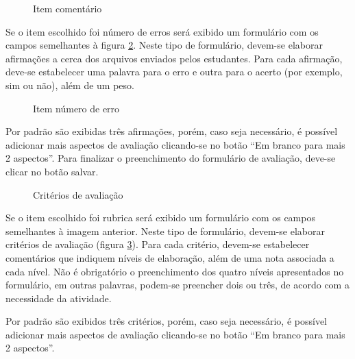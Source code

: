 \begin{figure}
 \begin{center}
  \caption{Item comentário}
  \label{fig:item_comentario}
 \end{center}
\end{figure}


Se o item escolhido foi número de erros será exibido um formulário com os campos semelhantes à figura \ref{fig:item_numero_erro}. Neste tipo de formulário, devem-se elaborar afirmações a cerca dos arquivos enviados pelos estudantes. Para cada afirmação, deve-se estabelecer uma palavra para o erro e outra para o acerto (por exemplo, sim ou não), além de um peso.

\begin{figure}
 \begin{center}
  \caption{Item número de erro}
  \label{fig:item_numero_erro}
 \end{center}
\end{figure}

Por padrão são exibidas três afirmações, porém, caso seja necessário, é possível adicionar mais aspectos de avaliação clicando-se no botão “Em branco para mais 2 aspectos”. Para finalizar o preenchimento do formulário de avaliação, deve-se clicar no botão salvar.

\begin{figure}
 \begin{center}
  \caption{Critérios de avaliação}
  \label{fig:criterios_ava}
 \end{center}
\end{figure}

Se o item escolhido foi rubrica será exibido um formulário com os campos semelhantes à imagem anterior. Neste tipo de formulário, devem-se elaborar critérios de avaliação (figura \ref{fig:criterios_ava}). Para cada critério, devem-se estabelecer comentários que indiquem níveis de elaboração, além de uma nota associada a cada nível. Não é obrigatório o preenchimento dos quatro níveis apresentados no formulário, em outras palavras, podem-se preencher dois ou três, de acordo com a necessidade da atividade.

Por padrão são exibidos três critérios, porém, caso seja necessário, é possível adicionar mais aspectos de avaliação clicando-se no botão “Em branco para mais 2 aspectos”.

